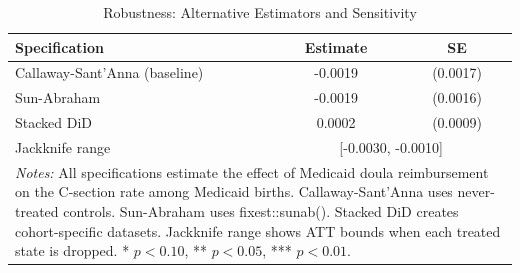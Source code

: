 \begin{table}[t]
\centering
\caption{Robustness: Alternative Estimators and Sensitivity}
\label{tab:robust}
\begin{tabular}{lcc}
\hline\hline
Specification & Estimate & SE \\
\hline
Callaway-Sant'Anna (baseline) & -0.0019 & (0.0017) \\
Sun-Abraham & -0.0019 & (0.0016) \\
Stacked DiD & 0.0002 & (0.0009) \\
\hline
Jackknife range & \multicolumn{2}{c}{[-0.0030, -0.0010]} \\
\hline\hline
\multicolumn{3}{p{0.85\textwidth}}{\footnotesize \textit{Notes:} All specifications estimate the effect of Medicaid doula reimbursement on the C-section rate among Medicaid births. Callaway-Sant'Anna uses never-treated controls. Sun-Abraham uses fixest::sunab(). Stacked DiD creates cohort-specific datasets. Jackknife range shows ATT bounds when each treated state is dropped. * $p<0.10$, ** $p<0.05$, *** $p<0.01$.}
\end{tabular}
\end{table}

